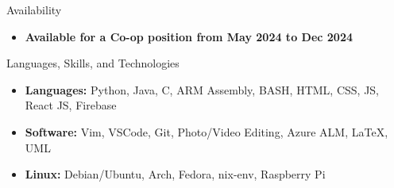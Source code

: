 \documentclass[]{mcdowellcv}
\begin{document}
	\makeheader

	\begin{cvsection}{Availability}
		\begin{cvsubsection}{}{}{}
			\begin{itemize}
				\item \textbf{Available for a Co-op position from May 2024 to Dec 2024}
			\end{itemize}
		\end{cvsubsection}
	\end{cvsection}

	\begin{cvsection}{Languages, Skills, and Technologies}
		\begin{cvsubsection}{}{}{}	
			\begin{itemize}
					\item \textbf{Languages:} Python, Java, C, ARM Assembly, BASH, HTML, CSS, JS, React JS, Firebase
					\item \textbf{Software:} Vim, VSCode, Git, Photo/Video Editing, Azure ALM, \LaTeX, UML
					\item \textbf{Linux:} Debian/Ubuntu, Arch, Fedora, nix-env, Raspberry Pi 
			\end{itemize}
		\end{cvsubsection}
	\end{cvsection}
\end{document}
